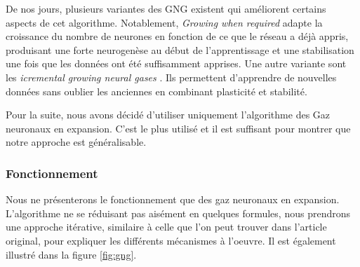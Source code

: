 	De nos jours, plusieurs variantes des GNG existent qui améliorent certains aspects de cet algorithme. Notablement, \textit{Growing when required} \cite{marsland2002self} adapte la croissance du nombre de neurones en fonction de ce que le réseau a déjà appris, produisant une forte neurogenèse au début de l'apprentissage et une stabilisation une fois que les données ont été suffisamment apprises. Une autre variante sont les \textit{icremental growing neural gases} \cite{prudent2005incremental}. Ils permettent d'apprendre de nouvelles données sans oublier les anciennes en combinant plasticité et stabilité.

	Pour la suite, nous avons décidé d'utiliser uniquement l'algorithme des Gaz neuronaux en expansion. C'est le plus utilisé et il est suffisant pour montrer que notre approche est généralisable.

	\subsubsection{Fonctionnement}

	Nous ne présenterons le fonctionnement que des gaz neuronaux en expansion. L'algorithme ne se réduisant pas aisément en quelques formules, nous prendrons une approche itérative, similaire à celle que l'on peut trouver dans l'article original, pour expliquer les différents mécanismes à l'oeuvre. Il est également illustré dans la figure \ref{fig:gng}.

